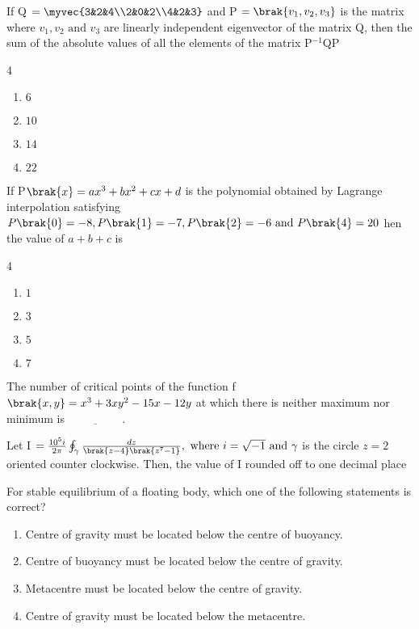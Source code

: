 \item If Q $= \myvec{3&2&4\\2&0&2\\4&2&3} $ and P $=\brak{v_{1},v_{2},v_{3}}$ is the matrix where $v_{1},v_{2}\text{ and }v_{3}$ are linearly independent eigenvector of the matrix Q, then the sum of the absolute values of all the elements of the matrix P$^{-1}$QP

\begin{multicols} {4}
    \begin{enumerate}
        \item $6$
        \item $10$
        \item $14$
        \item $22$
    \end{enumerate}
\end{multicols}
\bigskip

\item If P$\brak{x}=ax^{3}+bx^{2}+cx+d$ is the polynomial obtained by Lagrange interpolation satisfying $P\brak{0}=-8,P\brak{1}=-7,P\brak{2}=-6\text{ and }P\brak{4}=20$ hen the value of $a+b+c$ is 

\begin{multicols} {4}
    \begin{enumerate}
        \item $1$
        \item $3$
        \item $5$
        \item $7$
    \end{enumerate}
\end{multicols}
\bigskip

\item The number of critical points of the function f$\brak{x,y}=x^{3}+3xy^{2}-15x-12y$ at which there is neither maximum nor minimum is $\underline{\hspace{2cm}}.$
\bigskip

\item Let I $=\frac{10^{5}i}{2\pi}\oint_{\gamma}\frac{dz}{\brak{z-4}\brak{z^{7}-1}},\text{ where } i = \sqrt{-1} \text{ and } \gamma$ is the circle $z=2$ oriented counter clockwise. Then, the value of I rounded off to one decimal place
\bigskip

\item For stable equilibrium of a floating body, which one of the following statements is correct?

\begin{enumerate}
    \item Centre of gravity must be located below the centre of buoyancy.
     \item Centre of buoyancy must be located below the centre of gravity.
    \item Metacentre must be located below the centre of gravity.
     \item Centre of gravity must be located below the metacentre.
\end{enumerate}
\bigskip

